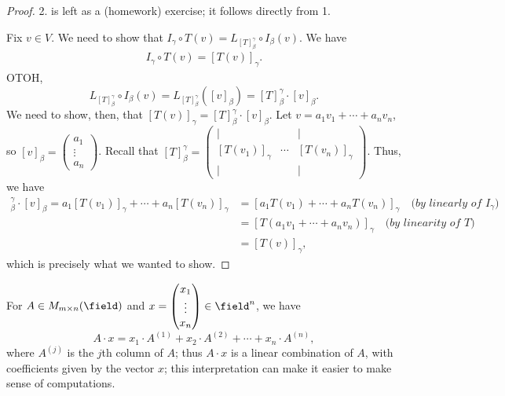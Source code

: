 \begin{proof}
    2. is left as a (homework) exercise; it follows directly from 1.

    Fix $v \in V$. We need to show that $I_\gamma \circ T(v) = L_{[T]_\beta^\gamma} \circ I_\beta(v)$. We have \begin{align*}
        I_\gamma \circ T(v) = [T(v)]_\gamma.
    \end{align*}
    OTOH, \[
    L_{[T]_\beta^\gamma} \circ I_\beta (v) = L_{[T]_\beta^\gamma} ([v]_\beta) = [T]_\beta^\gamma \cdot [v]_\beta.
    \]
    We need to show, then, that $[T(v)]_\gamma = [T]_\beta^\gamma \cdot [v]_\beta$.
    Let $v = a_1 v_1 + \cdots + a_n v_n$, so $[v]_\beta = \begin{pmatrix}
        a_1\\
        \vdots\\
        a_n
    \end{pmatrix}$. Recall that $[T]_\beta^\gamma = \begin{pmatrix}
        \vert &  & \vert\\
        [T(v_1)]_\gamma & \cdots & [T(v_n)]_\gamma\\
        \vert &  & \vert
    \end{pmatrix}$. Thus, we have \begin{align*}
        [T]_\beta^\gamma \cdot [v]_\beta = a_1 [T(v_1)]_\gamma + \cdots + a_n [T(v_n)]_\gamma &= [a_1T(v_1) + \cdots + a_n T(v_n)]_\gamma \quad \textit{(by linearly of } I_\gamma\textit{)}\\
        &= [T(a_1 v_1 + \cdots + a_n v_n)]_\gamma \quad \textit{(by linearity of }T\textit{)}\\
        &= [T(v)]_\gamma,
    \end{align*}
    which is precisely what we wanted to show.
\end{proof}

\begin{remark}
    For $A \in M_{m \times n}(\field)$ and $x = \begin{pmatrix}
        x_1\\
        \vdots\\
        x_n
    \end{pmatrix} \in \field^n$, we have \[
    A \cdot x = x_1 \cdot A^{(1)} + x_2 \cdot A^{(2)} + \cdots + x_n \cdot A^{(n)},    
    \]
    where $A^{(j)}$ is the $j$th column of $A$; thus $A \cdot x$ is a linear combination of $A$, with coefficients given by the vector $x$; this interpretation can make it easier to make sense of computations.
\end{remark}